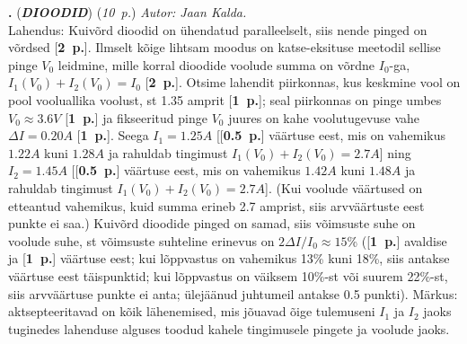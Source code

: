 \documentclass[12pt,a5paper]{article}
\newcommand{\numb}[1]{\vspace{5pt}\textbf{\large #1}}
\newcommand{\nimi}[1]{(\textsl{\small #1})}
\newcommand{\punktid}[1]{(\emph{#1~p.})}
\newcounter{ylesanne}
\newcommand{\yl}[1]{\addtocounter{ylesanne}{1}\numb{\theylesanne.} \nimi{\bf{#1}} \newblock{}}
\newcommand{\pp}[1]{[\textbf{#1~p.}]}
\newcommand{\autor}[1]{\emph{ Autor: #1.\\}}
\begin{document}
\yl{DIOODID} \punktid{10} \autor{Jaan Kalda}
Lahendus: Kuivõrd dioodid on ühendatud paralleelselt, siis nende pinged on võrdsed  \pp{2}. Ilmselt kõige lihtsam moodus on katse-eksituse meetodil sellise pinge $V_0$ leidmine, mille korral dioodide voolude summa on võrdne $I_0$-ga, $I_1(V_0)+I_2(V_0)=I_0$  \pp{2}. Otsime lahendit piirkonnas, kus keskmine vool on pool vooluallika voolust, st 1.35 amprit  \pp{1}; seal piirkonnas on pinge umbes $V_0\approx \SI{3.6}V$ \pp{1} ja fikseeritud pinge $V_0$ juures on kahe voolutugevuse vahe $\Delta I = \SI {0.20}A$  \pp{1}. Seega $I_1=\SI{1.25}A$ [\pp{0.5} väärtuse eest, mis on vahemikus $\SI{1.22}A$ kuni $\SI{1.28}A$  ja rahuldab tingimust $I_1(V_0)+I_2(V_0)=\SI{2.7}A$] ning $I_2=\SI{1.45}A$ [\pp{0.5} väärtuse eest, mis on vahemikus $\SI{1.42}A$ kuni $\SI{1.48}A$ ja rahuldab tingimust $I_1(V_0)+I_2(V_0)=\SI{2.7}A$]. (Kui voolude väärtused on etteantud vahemikus, kuid summa erineb 2.7 amprist, siis arvväärtuste eest punkte ei saa.) Kuivõrd dioodide pinged on samad, siis võimsuste suhe on voolude suhe, st võimsuste suhteline erinevus on $2\Delta I/I_0\approx 15$\%  (\pp{1} avaldise ja \pp{1} väärtuse eest; kui lõppvastus on vahemikus 13\% kuni 18\%, siis antakse väärtuse eest täispunktid; kui lõppvastus on väiksem 10\%-st või suurem 22\%-st, siis arvväärtuse punkte ei anta; ülejäänud juhtumeil antakse 0.5 punkti). Märkus: aktsepteeritavad on kõik lähenemised, mis jõuavad õige tulemuseni $I_1$ ja $I_2$ jaoks tuginedes lahenduse alguses toodud kahele tingimusele pingete ja voolude jaoks.
\end{document}
